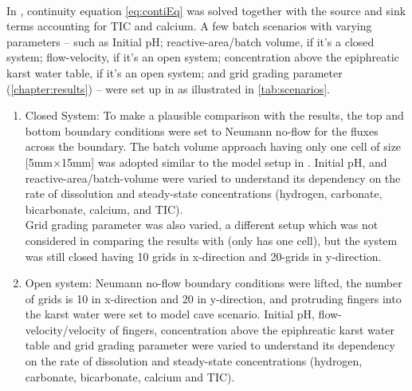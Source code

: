 \paragraph*{\DuMuX} In \DuMuX, continuity equation \ref{eq:contiEq} was solved together with the source and sink terms accounting for 
TIC and calcium. A few batch scenarios with varying parameters -- such as Initial pH; reactive-area/batch volume, if it's a closed system; 
flow-velocity, if it's an open system;  concentration above the epiphreatic karst water table, if it's an open system; and grid grading 
parameter (\ref{chapter:results}) -- were set up in \DuMuX as illustrated in \cref{tab:scenarios}. 
\begin{enumerate}
    \item Closed System: To make a plausible comparison with the \MATLAB results, the top and bottom boundary 
    conditions were set to Neumann no-flow for the fluxes across the boundary. The batch volume approach having only 
    one cell of size [5mm$\times$15mm] was adopted similar to the model setup in \MATLAB. Initial pH, and reactive-area/batch-volume 
    were varied to understand its dependency on the rate of dissolution and steady-state concentrations (hydrogen, carbonate, bicarbonate, calcium, and TIC).\\
    Grid grading parameter was also varied, a different setup which was not considered in comparing the results with 
    \MATLAB (\MATLAB only has one cell), but the system was still closed having 10 grids in x-direction and 20-grids in y-direction. 
    \item Open system: Neumann no-flow boundary conditions were lifted, the number of grids is 10 in x-direction and 20 in y-direction, 
    and  protruding  fingers into the karst water were set to model cave scenario. Initial pH, flow-velocity/velocity of fingers,  
    concentration above the epiphreatic karst water table and grid grading parameter were varied to understand its dependency on the rate 
    of dissolution and steady-state concentrations (hydrogen, carbonate, bicarbonate, calcium and TIC).
\end{enumerate}


